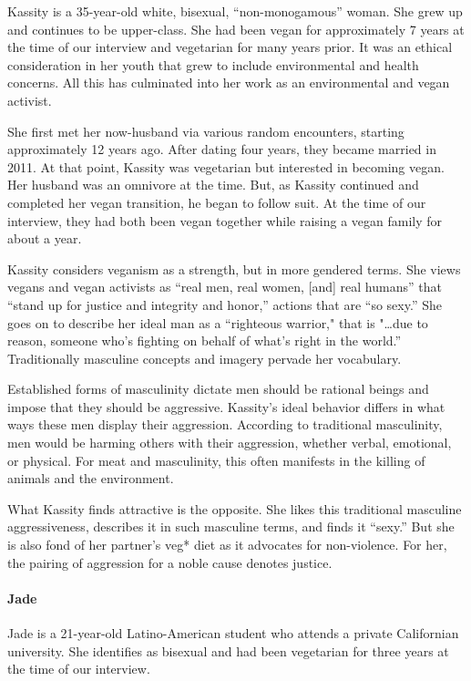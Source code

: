 \documentclass[twoside]{report}
\begin{document}
\begin{multicols*}{2}
Kassity is a 35-year-old white, bisexual, ``non-monogamous'' woman. She
grew up and continues to be upper-class. She had been vegan for
approximately 7 years at the time of our interview and vegetarian for
many years prior. It was an ethical consideration in her youth that grew
to include environmental and health concerns. All this has culminated
into her work as an environmental and vegan activist.

She first met her now-husband via various random encounters, starting
approximately 12 years ago. After dating four years, they became married
in 2011. At that point, Kassity was vegetarian but interested in
becoming vegan. Her husband was an omnivore at the time. But, as Kassity
continued and completed her vegan transition, he began to follow suit.
At the time of our interview, they had both been vegan together while
raising a vegan family for about a year.

Kassity considers veganism as a strength, but in more gendered terms. She views vegans and vegan activists as ``real men, real women, {[}and{]} real humans'' that ``stand up for justice and integrity and honor,'' actions that are ``so sexy.'' She goes on to describe her ideal man as a ``righteous warrior," that is "\ldots due to reason, someone who's fighting on behalf of
what's right in the world.'' Traditionally masculine concepts and imagery pervade her vocabulary. 

Established forms of masculinity dictate men should be rational beings and impose that they should be aggressive. Kassity's ideal behavior differs in what ways these men display their aggression. According to traditional masculinity, men would be harming others with their aggression, whether verbal, emotional, or physical. For meat and masculinity, this often manifests in the killing of animals and the environment.

What Kassity finds attractive is the opposite. She likes this
traditional masculine aggressiveness, describes it in such masculine
terms, and finds it ``sexy.'' But she is also fond of her partner's veg* diet as it advocates for non-violence. For her, the pairing of aggression for a noble cause denotes justice.
%
\paragraph{Jade}

Jade is a 21-year-old Latino-American student who attends a private
Californian university. She identifies as bisexual and had been
vegetarian for three years at the time of our interview. 


\end{multicols*}
\end{document}

